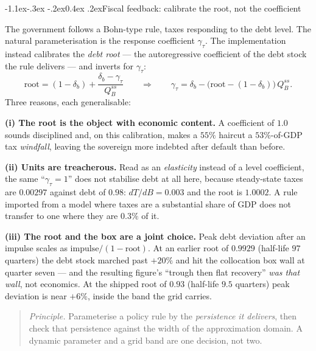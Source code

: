 \documentclass[10pt,a4paper]{article}
\makeatletter
\theoremstyle{definition}
\theoremstyle{plain}
\theoremstyle{remark}
\renewcommand\subsection{\@startsection{subsection}{2}{\z@}%
  {-1.1ex\@plus -.3ex \@minus -.2ex}{0.4ex \@plus .2ex}{\normalfont\normalsize\bfseries}}
\makeatother
\begin{document}
\subsection{Fiscal feedback: calibrate the root, not the coefficient}

The government follows a Bohn-type rule, taxes responding to the debt level. The natural
parameterisation is the response coefficient $\gamma_\tau$. The implementation instead
calibrates the \emph{debt root} --- the autoregressive coefficient of the debt stock the rule
delivers --- and inverts for $\gamma_\tau$:
\begin{equation}
  \text{root} = (1-\delta_b) + \frac{\delta_b - \gamma_\tau}{Q_B^{ss}}
  \qquad\Longrightarrow\qquad
  \gamma_\tau = \delta_b - \big(\text{root} - (1-\delta_b)\big)\,Q_B^{ss}.
  \label{eq:debtroot}
\end{equation}
Three reasons, each generalisable:

\textbf{(i) The root is the object with economic content.} A coefficient of $1.0$ sounds
disciplined and, on this calibration, makes a $55\%$ haircut a $53\%$-of-GDP tax
\emph{windfall}, leaving the sovereign more indebted after default than before.

\textbf{(ii) Units are treacherous.} Read as an \emph{elasticity} instead of a level
coefficient, the same ``$\gamma_\tau=1$'' does not stabilise debt at all here, because
steady-state taxes are $0.00297$ against debt of $0.98$: $dT/dB = 0.003$ and the root is
$1.0002$. A rule imported from a model where taxes are a substantial share of GDP does not
transfer to one where they are $0.3\%$ of it.

\textbf{(iii) The root and the box are a joint choice.} Peak debt deviation after an impulse
scales as $\text{impulse}/(1-\text{root})$. At an earlier root of $0.9929$ (half-life $97$
quarters) the debt stock marched past $+20\%$ and hit the collocation box wall at quarter
seven --- and the resulting figure's ``trough then flat recovery'' \emph{was that wall}, not
economics. At the shipped root of $0.93$ (half-life $9.5$ quarters) peak deviation is near
$+6\%$, inside the band the grid carries.

\begin{quote}
\emph{Principle.} Parameterise a policy rule by the \emph{persistence it delivers}, then check
that persistence against the width of the approximation domain. A dynamic parameter and a grid
band are one decision, not two.
\end{quote}
\end{document}
